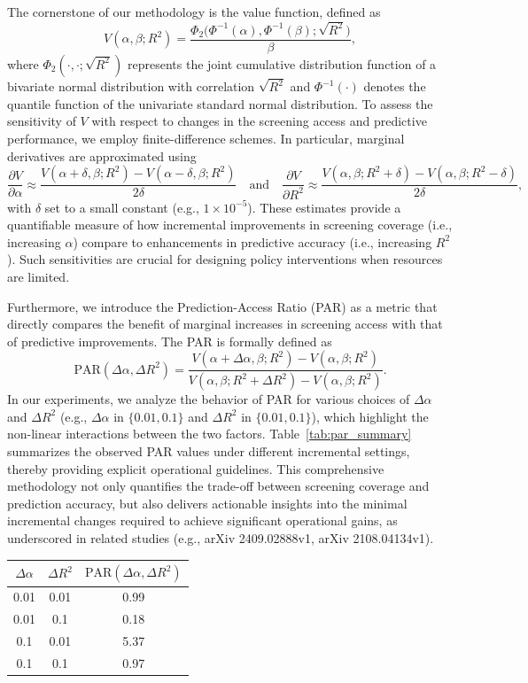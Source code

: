 \documentclass[11pt]{article}
\begin{document}
The cornerstone of our methodology is the value function, defined as 
\[
V(\alpha,\beta; R^2)=\frac{\Phi_2\big(\Phi^{-1}(\alpha),\Phi^{-1}(\beta);\sqrt{R^2}\big)}{\beta},
\]
where \(\Phi_2(\cdot,\cdot;\sqrt{R^2})\) represents the joint cumulative distribution function of a bivariate normal distribution with correlation \(\sqrt{R^2}\) and \(\Phi^{-1}(\cdot)\) denotes the quantile function of the univariate standard normal distribution. To assess the sensitivity of \(V\) with respect to changes in the screening access and predictive performance, we employ finite-difference schemes. In particular, marginal derivatives are approximated using
\[
\frac{\partial V}{\partial \alpha} \approx \frac{V(\alpha+\delta,\beta; R^2)-V(\alpha-\delta,\beta; R^2)}{2\delta} \quad \text{and} \quad \frac{\partial V}{\partial R^2} \approx \frac{V(\alpha,\beta; R^2+\delta)-V(\alpha,\beta; R^2-\delta)}{2\delta},
\]
with \(\delta\) set to a small constant (e.g., \(1\times10^{-5}\)). These estimates provide a quantifiable measure of how incremental improvements in screening coverage (i.e., increasing \(\alpha\)) compare to enhancements in predictive accuracy (i.e., increasing \(R^2\)). Such sensitivities are crucial for designing policy interventions when resources are limited.

Furthermore, we introduce the Prediction-Access Ratio (PAR) as a metric that directly compares the benefit of marginal increases in screening access with that of predictive improvements. The PAR is formally defined as
\[
\text{PAR}(\Delta \alpha, \Delta R^2)=\frac{V(\alpha+\Delta \alpha,\beta; R^2)-V(\alpha,\beta; R^2)}{V(\alpha,\beta; R^2+\Delta R^2)-V(\alpha,\beta; R^2)}.
\]
In our experiments, we analyze the behavior of PAR for various choices of \(\Delta \alpha\) and \(\Delta R^2\) (e.g., \(\Delta \alpha\) in \(\{0.01, 0.1\}\) and \(\Delta R^2\) in \(\{0.01, 0.1\}\)), which highlight the non-linear interactions between the two factors. Table~\ref{tab:par_summary} summarizes the observed PAR values under different incremental settings, thereby providing explicit operational guidelines. This comprehensive methodology not only quantifies the trade-off between screening coverage and prediction accuracy, but also delivers actionable insights into the minimal incremental changes required to achieve significant operational gains, as underscored in related studies (e.g., arXiv 2409.02888v1, arXiv 2108.04134v1).

\begin{center}
\begin{tabular}{|c|c|c|}
\hline
\(\Delta \alpha\) & \(\Delta R^2\) & \(\text{PAR}(\Delta \alpha, \Delta R^2)\) \\
\hline
0.01 & 0.01 & 0.99 \\
0.01 & 0.1  & 0.18 \\
0.1  & 0.01 & 5.37 \\
0.1  & 0.1  & 0.97 \\
\hline
\end{tabular}
\end{center}
\end{document}
